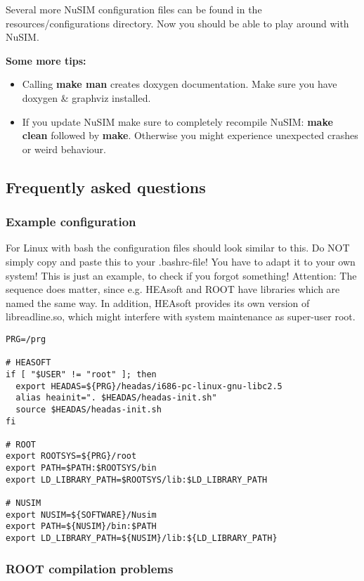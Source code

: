 Several more NuSIM configuration files can be found in the resources/configurations directory. Now you should be able to play around with NuSIM.

\textbf{Some more tips:}
\begin{itemize}
\item Calling \textbf{make man} creates doxygen documentation. Make sure you have doxygen \& graphviz installed.
\item If you update NuSIM make sure to completely recompile NuSIM: \textbf{make clean} followed by \textbf{make}. Otherwise you might experience unexpected crashes or weird behaviour. 
\end{itemize}

\subsection{Frequently asked questions}

\subsubsection{Example configuration}
For Linux with bash the configuration files should look similar to this. Do NOT simply copy and paste this to your .bashrc-file! You have to adapt it to your own system! This is just an example, to check if you forgot something! 
Attention: The sequence does matter, since e.g. HEAsoft and ROOT have libraries which are named the same way. In addition, HEAsoft provides its own version of libreadline.so, which might interfere with system maintenance as super-user root. 
 
\begin{verbatim}
PRG=/prg

# HEASOFT
if [ "$USER" != "root" ]; then
  export HEADAS=${PRG}/headas/i686-pc-linux-gnu-libc2.5
  alias heainit=". $HEADAS/headas-init.sh"
  source $HEADAS/headas-init.sh
fi

# ROOT
export ROOTSYS=${PRG}/root
export PATH=$PATH:$ROOTSYS/bin
export LD_LIBRARY_PATH=$ROOTSYS/lib:$LD_LIBRARY_PATH

# NUSIM
export NUSIM=${SOFTWARE}/Nusim
export PATH=${NUSIM}/bin:$PATH
export LD_LIBRARY_PATH=${NUSIM}/lib:${LD_LIBRARY_PATH}
\end{verbatim}

\subsubsection{ROOT compilation problems}

